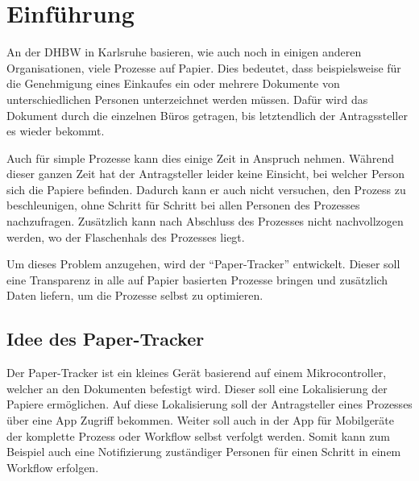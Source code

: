 \chapter{Einführung}

An der \gls{DHBW} in Karlsruhe basieren, wie auch noch in einigen anderen Organisationen, viele Prozesse auf Papier.
Dies bedeutet, dass beispielsweise für die Genehmigung eines Einkaufes ein oder mehrere Dokumente von unterschiedlichen Personen unterzeichnet werden müssen.
Dafür wird das Dokument durch die einzelnen Büros getragen, bis letztendlich der Antragssteller es wieder bekommt.

Auch für simple Prozesse kann dies einige Zeit in Anspruch nehmen.
Während dieser ganzen Zeit hat der Antragsteller leider keine Einsicht, bei welcher Person sich die Papiere befinden.
Dadurch kann er auch nicht versuchen, den Prozess zu beschleunigen, ohne Schritt für Schritt bei allen Personen des Prozesses nachzufragen.
Zusätzlich kann nach Abschluss des Prozesses nicht nachvollzogen werden, wo der Flaschenhals des Prozesses liegt.

Um dieses Problem anzugehen, wird der \enquote{Paper-Tracker} entwickelt.
Dieser soll eine Transparenz in alle auf Papier basierten Prozesse bringen und zusätzlich Daten liefern, um die Prozesse selbst zu optimieren.

\section{Idee des Paper-Tracker}

Der Paper-Tracker ist ein kleines Gerät basierend auf einem Mikrocontroller, welcher an den Dokumenten befestigt wird.
Dieser soll eine Lokalisierung der Papiere ermöglichen.
Auf diese Lokalisierung soll der Antragsteller eines Prozesses über eine App Zugriff bekommen.
Weiter soll auch in der App für Mobilgeräte der komplette Prozess oder Workflow selbst verfolgt werden.
Somit kann zum Beispiel auch eine Notifizierung zuständiger Personen für einen Schritt in einem Workflow erfolgen.
